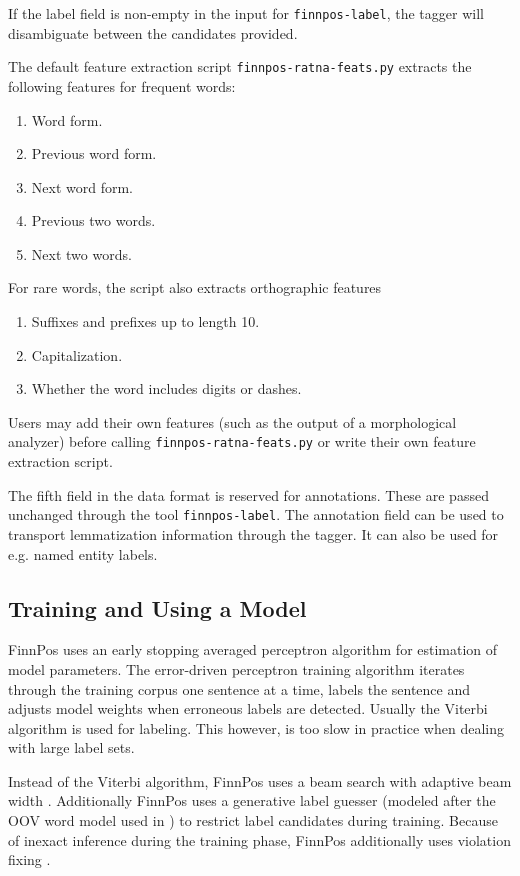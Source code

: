 \documentclass{llncs}
\begin{document}
If the label field is non-empty in the input for {\tt finnpos-label}, the tagger will disambiguate between the candidates provided.

The default feature extraction script {\tt finnpos-ratna-feats.py}
extracts the following features for frequent words:

\begin{enumerate}
\item Word form.
\item Previous word form.
\item Next word form.
\item Previous two words.
\item Next two words.
\end{enumerate}

For rare words, the script also extracts orthographic features

\begin{enumerate}
\item Suffixes and prefixes up to length 10.
\item Capitalization.
\item Whether the word includes digits or dashes.
\end{enumerate}

Users may add their own features (such as the output of a
morphological analyzer) before calling {\tt finnpos-ratna-feats.py} or
write their own feature extraction script.

The fifth field in the data format is reserved for annotations. These
are passed unchanged through the tool {\tt finnpos-label}. The
annotation field can be used to transport lemmatization information
through the tagger. It can also be used for e.g. named entity labels.

\subsection{Training and Using a Model}

FinnPos uses an early stopping averaged perceptron algorithm for
estimation of model parameters. The error-driven perceptron training
algorithm iterates through the training corpus one sentence at a time,
labels the sentence and adjusts model weights when erroneous labels
are detected. Usually the Viterbi algorithm \cite{collins/2002} is
used for labeling. This however, is too slow in practice when dealing
with large label sets.

Instead of the Viterbi algorithm, FinnPos uses a beam search with
adaptive beam width \cite{pal/2006}. Additionally FinnPos uses a generative
label guesser (modeled after the OOV word model used in
\cite{brants/2000}) to restrict label candidates during
training. Because of inexact inference during the training phase,
FinnPos additionally uses violation fixing \cite{huang/2012}.
\end{document}
